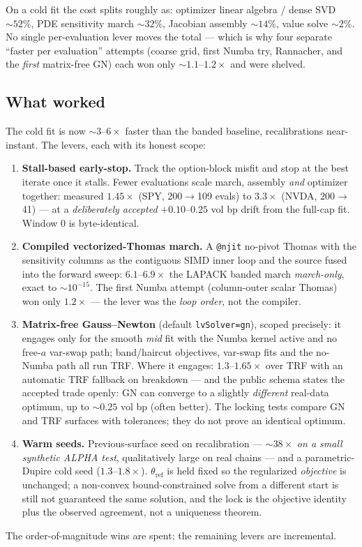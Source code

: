 \documentclass[11pt]{article}
\begin{document}
On a cold fit the cost splits roughly as: optimizer linear algebra / dense SVD
$\sim52\%$, PDE sensitivity march $\sim32\%$, Jacobian assembly $\sim14\%$,
value solve $\sim2\%$. No single per-evaluation lever moves the total ---
which is why four separate ``faster per evaluation'' attempts (coarse grid,
first Numba try, Rannacher, and the \emph{first} matrix-free GN) each won only
$\sim1.1$--$1.2\times$ and were shelved.

\subsection{What worked}

\begin{perfbox}
The cold fit is now $\sim3$--$6\times$ faster than the banded baseline,
recalibrations near-instant. The levers, each with its honest scope:
\begin{enumerate}[leftmargin=1.5em]
\item \textbf{Stall-based early-stop.} Track the option-block misfit and stop
at the best iterate once it stalls. Fewer evaluations scale march, assembly
\emph{and} optimizer together: measured $1.45\times$ (SPY, 200$\to$109 evals)
to $3.3\times$ (NVDA, 200$\to$41) --- at a \emph{deliberately accepted}
$+0.10$--$0.25$ vol bp drift from the full-cap fit. Window $0$ is
byte-identical.
\item \textbf{Compiled vectorized-Thomas march.} A \texttt{@njit} no-pivot
Thomas with the sensitivity columns as the contiguous SIMD inner loop and the
source fused into the forward sweep: $6.1$--$6.9\times$ the LAPACK banded
march \emph{march-only}, exact to $\sim10^{-15}$. The first Numba attempt
(column-outer scalar Thomas) won only $1.2\times$ --- the lever was the
\emph{loop order}, not the compiler.
\item \textbf{Matrix-free Gauss--Newton} (default \texttt{lvSolver=gn}),
scoped precisely: it engages only for the smooth \emph{mid} fit with the
Numba kernel active and no free-$a$ var-swap path; band/haircut objectives,
var-swap fits and the no-Numba path all run TRF. Where it engages:
$1.3$--$1.65\times$ over TRF with an automatic TRF fallback on breakdown ---
and the public schema states the accepted trade openly: GN can converge to a
slightly \emph{different} real-data optimum, up to $\sim0.25$ vol bp (often
better). The locking tests compare GN and TRF surfaces with tolerances; they
do not prove an identical optimum.
\item \textbf{Warm seeds.} Previous-surface seed on recalibration ---
$\sim38\times$ \emph{on a small synthetic ALPHA test}, qualitatively large on
real chains --- and a parametric-Dupire cold seed ($1.3$--$1.8\times$).
$\theta_{\text{ref}}$ is held fixed so the regularized \emph{objective} is
unchanged; a non-convex bound-constrained solve from a different start is
still not guaranteed the same solution, and the lock is the objective
identity plus the observed agreement, not a uniqueness theorem.
\end{enumerate}
The order-of-magnitude wins are spent; the remaining levers are incremental.
\end{perfbox}
\end{document}
